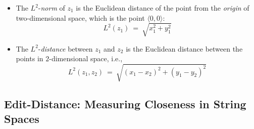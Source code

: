 \medskip

   

\begin{itemize}
\item
The $L^2$-{\it norm} of $z_1$ is the Euclidean distance of the point from the {\it origin} of
two-dimensional space, which is the point $\langle 0,0 \rangle$:
\[ L^2(z_1) \ = \ \sqrt{x_1^2 + y_1^2}  \]  

\medskip\item
The $L^2$-{\it distance} between $z_1$ and $z_2$ is the Euclidean distance between the points in $2$-dimensional space, i.e.,
\[ L^2(z_1, z_2) \ = \ \sqrt{(x_1 - x_2)^2 + (y_1 - y_2)^2} \]
\end{itemize}

\subsection{Edit-Distance: Measuring Closeness in String Spaces}

